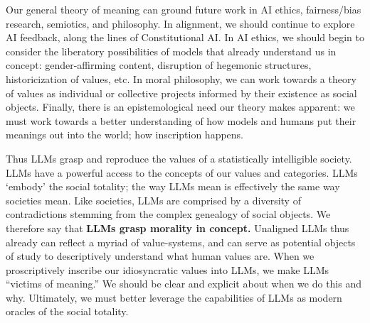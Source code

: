 Our general theory of meaning can ground future work in AI ethics, fairness/bias research, semiotics, and philosophy. In alignment, we should continue to explore AI feedback, along the lines of Constitutional AI. In AI ethics, we should begin to consider the liberatory possibilities of models that already understand us in concept: gender-affirming content, disruption of hegemonic structures, historicization of values, etc.
In moral philosophy, we can work towards a theory of values as individual or collective projects informed by their existence as social objects.
Finally, there is an epistemological need our theory makes apparent: we must work towards a better understanding of how models and humans put their meanings out into the world; how inscription happens.

Thus LLMs grasp and reproduce the values of a statistically intelligible society. LLMs have a powerful access to the concepts of our values and categories. LLMs `embody' the social totality; the way LLMs mean is effectively the same way societies mean. Like societies, LLMs are comprised by a diversity of contradictions stemming from the complex genealogy of social objects. We therefore say that \textbf{LLMs grasp morality in concept.} Unaligned LLMs thus already can reflect a myriad of value-systems, and can serve as potential objects of study to descriptively understand what human values are. When we proscriptively inscribe our idiosyncratic values into LLMs, we make LLMs ``victims of meaning.'' We should be clear and explicit about when we do this and why. Ultimately, we must better leverage the capabilities of LLMs as modern oracles of the social totality.
